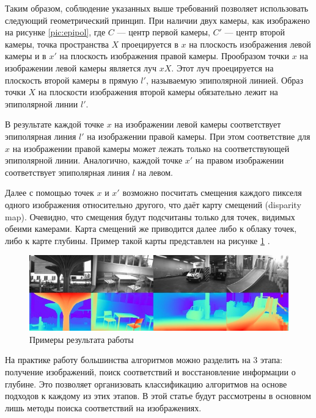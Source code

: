 Таким образом, соблюдение указанных выше требований позволяет использовать следующий геометрический принцип. При наличии двух камеры, как изображено 
на рисунке \ref{pic:epipol}, где $C$ — центр первой камеры, $C'$ — центр второй камеры, точка пространства $X$  
проецируется в $x$ на плоскость изображения левой камеры и в $x'$ на плоскость изображения правой камеры. Прообразом точки $x$ на изображении левой 
камеры является луч $xX$. Этот луч проецируется на плоскость второй камеры в прямую $l'$, называемую эпиполярной линией. Образ точки $X$ на плоскости 
изображения второй камеры обязательно лежит на эпиполярной линии $l'$.

В результате каждой точке $x$ на изображении левой камеры соответствует эпиполярная линия $l'$ на изображении правой камеры. При этом соответствие для $x$ на 
изображении правой камеры может лежать только на соответствующей эпиполярной линии. Аналогично, каждой точке $x'$ на правом изображении соответствует 
эпиполярная линия $l$ на левом.

Далее с помощью точек $x$ и $x'$ возможно посчитать смещения каждого пикселя одного изображения относительно другого, что даёт карту смещений (disparity map). 
Очевидно, что смещения будут подсчитаны только для точек, видимых обеими камерами. Карта смещений же приводится далее либо к облаку точек, либо к карте глубины. 
Пример такой карты представлен на рисунке \ref{pic:depth} \cite{lipson2021raft}. 

\begin{figure}[H]
	\begin{center}
		\includegraphics[scale=0.7]{pics/exmpl.jpg}
		\caption{Примеры результата работы} 
		\label{pic:depth} %
	\end{center}
\end{figure}

На практике работу большинства алгоритмов можно разделить на 3 этапа: получение изображений, поиск соответствий и восстановление информации о глубине. Это позволяет
организовать классификацию алгоритмов на основе подходов к каждому из этих этапов. В этой статье будут рассмотрены в основном лишь методы поиска соответствий на изображениях. 

